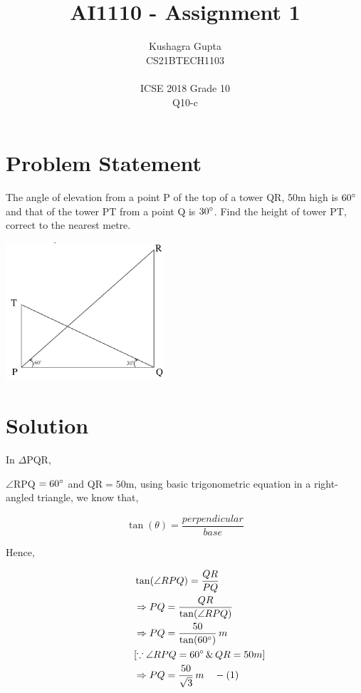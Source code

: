 \documentclass[twocoloumn]{article}
\title{AI1110 - Assignment 1}
\author{Kushagra Gupta \\ \normalsize CS21BTECH1103 \\ \vspace*{20pt}\\ \vspace*{20pt} \Large ICSE 2018 Grade 10 \\ \large Q10-c}
\date{}
\begin{document}
\maketitle 
\begin{multicols}{2}
\section*{Problem Statement}


The angle of elevation from a point P of the top of a tower QR, 50m high is $60\degree$ and that of the
tower PT from a point Q is $30\degree$. Find the height of tower PT, correct to the nearest metre.

\begin{center}
\includegraphics[width=167.5pt]{figure.png}
\end{center}

\section*{Solution}

In $\Delta$PQR, 

$\angle$RPQ  $= 60\degree$ and QR$ = 50$m, using basic trigonometric equation in a right-angled triangle, we know that,

$$\tan(\theta)=\frac{perpendicular}{base}$$

\noindent Hence, 

\begin{align*}
\hspace{30pt}&\tan(\angle RPQ) = \frac{QR}{PQ} \\
&\Rightarrow PQ = \frac{QR}{\tan(\angle RPQ)} \\
&\Rightarrow PQ = \frac{50}{\tan(60\degree)}\, m \\
&[\because \angle RPQ = 60\degree \, \& \, QR = 50m] \\
&\Rightarrow PQ = \frac{50}{\sqrt{3}}\, m \hspace{10pt}-(1)
\end{align*}


\end{multicols}
\end{document}
